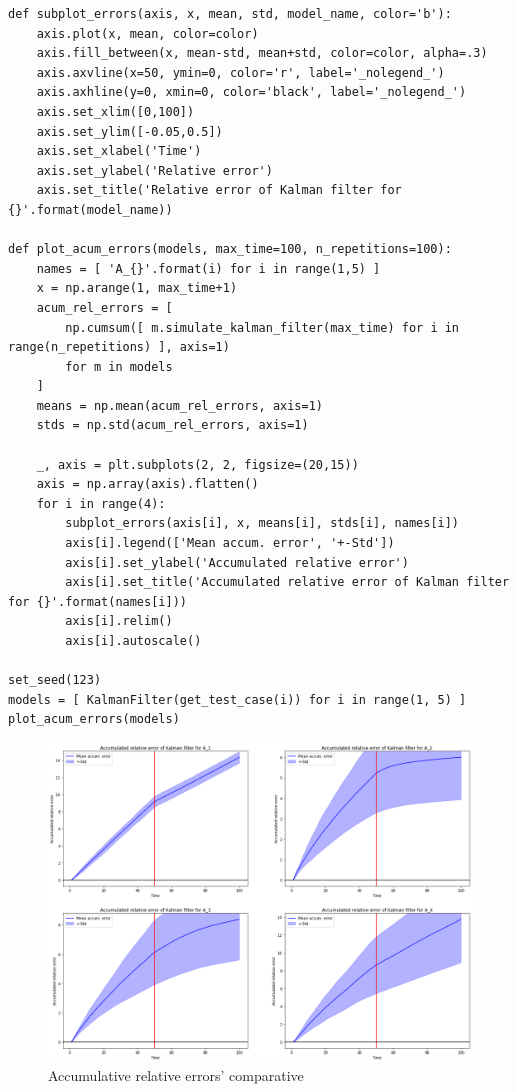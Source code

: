 \documentclass[a4paper]{article}
\begin{document}
\begin{verbatim}
def subplot_errors(axis, x, mean, std, model_name, color='b'):
	axis.plot(x, mean, color=color)
	axis.fill_between(x, mean-std, mean+std, color=color, alpha=.3)
	axis.axvline(x=50, ymin=0, color='r', label='_nolegend_')
	axis.axhline(y=0, xmin=0, color='black', label='_nolegend_')
	axis.set_xlim([0,100])
	axis.set_ylim([-0.05,0.5])
	axis.set_xlabel('Time')
	axis.set_ylabel('Relative error')
	axis.set_title('Relative error of Kalman filter for {}'.format(model_name))
	
def plot_acum_errors(models, max_time=100, n_repetitions=100):
	names = [ 'A_{}'.format(i) for i in range(1,5) ]
	x = np.arange(1, max_time+1)
	acum_rel_errors = [
		np.cumsum([ m.simulate_kalman_filter(max_time) for i in range(n_repetitions) ], axis=1)
		for m in models
	]
	means = np.mean(acum_rel_errors, axis=1)
	stds = np.std(acum_rel_errors, axis=1)
	
	_, axis = plt.subplots(2, 2, figsize=(20,15))  
	axis = np.array(axis).flatten()
	for i in range(4):
		subplot_errors(axis[i], x, means[i], stds[i], names[i])
		axis[i].legend(['Mean accum. error', '+-Std'])
		axis[i].set_ylabel('Accumulated relative error')
		axis[i].set_title('Accumulated relative error of Kalman filter for {}'.format(names[i]))
		axis[i].relim() 
		axis[i].autoscale()
		
set_seed(123) 
models = [ KalmanFilter(get_test_case(i)) for i in range(1, 5) ]
plot_acum_errors(models)
\end{verbatim}

\begin{figure}[H]
	\includegraphics[scale=.6]{figures/kalman_acum}
	\centering
	\caption{Accumulative relative errors' comparative}
\end{figure}
\end{document}

